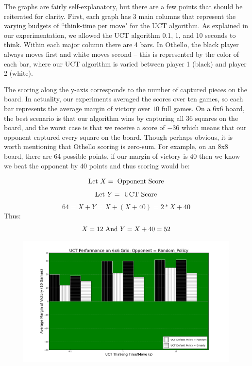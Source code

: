 \documentclass[12pt,letterpaper]{article}
\begin{document}
The graphs are fairly self-explanatory, but there are a few points that should be reiterated for clarity.  First, each graph has 3 main columns that represent the varying budgets of ``think-time per move" for the UCT algorithm.  As explained in our experimentation, we allowed the UCT algorithm 0.1, 1, and 10 seconds to think. Within each major column there are 4 bars.  In Othello, the black player always moves first and white moves second -- this is represented by the color of each bar, where our UCT algorithm is varied between player 1 (black) and player 2 (white). 

The scoring along the y-axis corresponds to the number of captured pieces on the board. In actuality, our experiments averaged the scores over ten games, so each bar represents the average margin of victory over $10$ full games. On a 6x6 board, the best scenario is that our algorithm wins by capturing all $36$ squares on the board, and the worst case is that we receive a score of $-36$ which means that our opponent captured every square on the board. Though perhaps obvious, it is worth mentioning that Othello scoring is zero-sum. For example, on an 8x8 board, there are 64 possible points, if our margin of victory is 40 then we know we beat the opponent by 40 points and thus scoring would be:
\vspace{-.4in}
\begin{center}
$$\textnormal{Let } X = \textnormal{ Opponent Score} $$
$$\textnormal{Let } Y = \textnormal{ UCT Score} $$
$$ 64 = X+Y = X+(X+40) = 2*X + 40$$ 
Thus:
$$ X = 12 \textnormal{  And   } Y = X+40 = 52$$ 
\end{center}

\begin{figure}[!hp]
\begin{center}
\includegraphics[scale=.4]{66_Random_Policy}
\end{center}
\end{figure}
\end{document}
